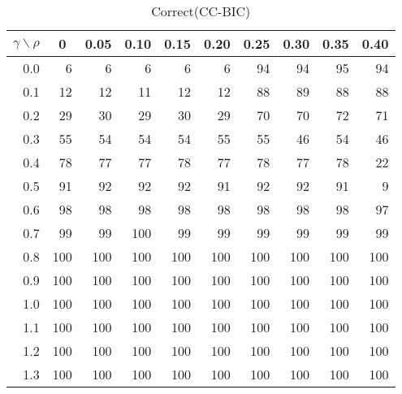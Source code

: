 \documentclass[12pt]{article}
\begin{document}
%
\begin{table}[!tbp]
\caption{Correct(CC-BIC)}
 \begin{center}
 \begin{tabular}{r|rrrrrrrrr}\hline\hline
\multicolumn{1}{c|}{$\gamma\backslash\rho$}&\multicolumn{1}{c}{0}&\multicolumn{1}{c}{0.05}&\multicolumn{1}{c}{0.10}&\multicolumn{1}{c}{0.15}&\multicolumn{1}{c}{0.20}&\multicolumn{1}{c}{0.25}&\multicolumn{1}{c}{0.30}&\multicolumn{1}{c}{0.35}&\multicolumn{1}{c}{0.40}\tabularnewline
\hline
0.0&  6&  6&  6&  6&  6& 94& 94& 95& 94\tabularnewline
0.1& 12& 12& 11& 12& 12& 88& 89& 88& 88\tabularnewline
0.2& 29& 30& 29& 30& 29& 70& 70& 72& 71\tabularnewline
0.3& 55& 54& 54& 54& 55& 55& 46& 54& 46\tabularnewline
0.4& 78& 77& 77& 78& 77& 78& 77& 78& 22\tabularnewline
0.5& 91& 92& 92& 92& 91& 92& 92& 91&  9\tabularnewline
0.6& 98& 98& 98& 98& 98& 98& 98& 98& 97\tabularnewline
0.7& 99& 99&100& 99& 99& 99& 99& 99& 99\tabularnewline
0.8&100&100&100&100&100&100&100&100&100\tabularnewline
0.9&100&100&100&100&100&100&100&100&100\tabularnewline
1.0&100&100&100&100&100&100&100&100&100\tabularnewline
1.1&100&100&100&100&100&100&100&100&100\tabularnewline
1.2&100&100&100&100&100&100&100&100&100\tabularnewline
1.3&100&100&100&100&100&100&100&100&100\tabularnewline
\hline
\end{tabular}

\end{center}

\end{table}
\end{document}
